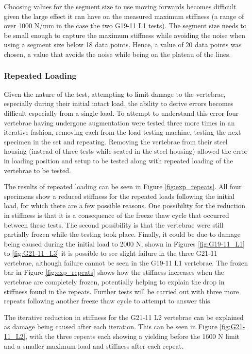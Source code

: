 Choosing values for the segment size to use moving forwards becomes difficult
given the large effect it can have on the measured maximum stiffness (a range of
over 1000 N/mm in the case the two G19-11 L1 tests). The segment size needs to
be small enough to capture the maximum stiffness while avoiding the noise when
using a segment size below 18 data points. Hence, a value of 20 data points was
chosen, a value that avoids the noise while being on the plateau of the lines.


\subsubsection{Repeated Loading}

Given the nature of the test, attempting to limit damage to the vertebrae,
especially during their initial intact load, the ability to derive errors
becomes difficult especially from a single load. To attempt to understand this
error four vertebrae having undergone augmentation were tested three more times
in an iterative fashion, removing each from the load testing machine, testing
the next specimen in the set and repeating. Removing the vertebrae from their
steel housing (instead of three tests while seated in the steel housing) allowed
the error in loading position and setup to be tested along with repeated loading
of the vertebrae to be tested.

The results of repeated loading can be seen in Figure \ref{fig:exp_repeats}. All
four specimens show a reduced stiffness for the repeated loads following the
initial load, for which there are a few possible reasons. One possibility for
the reduction in stiffness is that it is a consequence of the freeze thaw cycle
that occurred between these tests. The second possibility is that the vertebrae
were still partially frozen while the testing took place. Finally, it could be
due to damage being caused during the initial load to 2000 N, shown in Figures
\ref{fig:G19-11_L1} to \ref{fig:G21-11_L3} it is possible to see slight failure
in the three G21-11 vertebrae, although failure cannot be seen in the G19-11 L1
vertebrae. The frozen bar in Figure \ref{fig:exp_repeats} shows how the
stiffness increases when the vertebrae are completely frozen, potentially
helping to explain the drop in stiffness found in the repeats. Further tests
will be carried out with three more repeats following another freeze thaw cycle
to attempt to answer this.

The iterative reduction in stiffness for the G21-11 L2 vertebrae can be
explained as damage being caused after each iteration. This can be seen in
Figure \ref{fig:G21-11_L2}, with the three repeats each showing a yielding
before the 1600 N limit and a smaller maximum load and stiffness after each
repeat.

